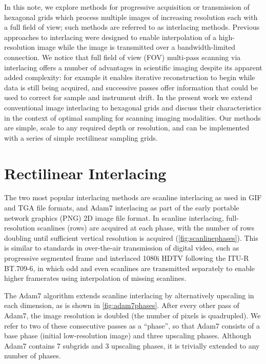 \documentclass[aip, amsmath, amssymb, nobibnotes, nofootinbib, citeautoscript, reprint, superscriptaddress]{revtex4-2}
\begin{document}
    In this note, we explore methods for progressive acquisition or transmission of hexagonal grids which process multiple images of increasing resolution each with a full field of view; such methods are referred to as interlacing methods.
    Previous approaches to interlacing were designed to enable interpolation of a high-resolution image while the image is transmitted over a bandwidth-limited connection.
    We notice that full field of view (FOV) multi-pass scanning via interlacing offers a number of advantages in scientific imaging despite its apparent added complexity: for example it enables iterative reconstruction to begin while data is still being acquired, and successive passes offer information that could be used to correct for sample and instrument drift.
    In the present work we extend conventional image interlacing to hexagonal grids and discuss their characteristics in the context of optimal sampling for scanning imaging modalities.
    Our methods are simple, scale to any required depth or resolution, and can be implemented with a series of simple rectilinear sampling grids.

    \section{\label{sec:rect}Rectilinear Interlacing}

    The two most popular interlacing methods are scanline interlacing as used in GIF and TGA file formats, and Adam7 interlacing as part of the early portable network graphics (PNG) 2D image file format\cite{png}.
    In scanline interlacing, full-resolution scanlines (rows) are acquired at each phase, with the number of rows doubling until sufficient vertical resolution is acquired (\autoref{fig:scanlinephases}).
    This is similar to standards in over-the-air transmission of digital video, such as progressive segmented frame and interlaced 1080i HDTV following the ITU-R BT.709-6\cite{hdtv}, in which odd and even scanlines are transmitted separately to enable higher framerates using interpolation of missing scanlines.

    The Adam7 algorithm extends scanline interlacing by alternatively upscaling in each dimension, as is shown in \autoref{fig:adam7phases}.
    After every other pass of Adam7, the image resolution is doubled (the number of pixels is quadrupled).
    We refer to two of these consecutive passes as a ``phase'', so that Adam7 consists of a base phase (initial low-resolution image) and three upscaling phases.
    Although Adam7 contains 7 subgrids and 3 upscaling phases, it is trivially extended to any number of phases.
\end{document}
